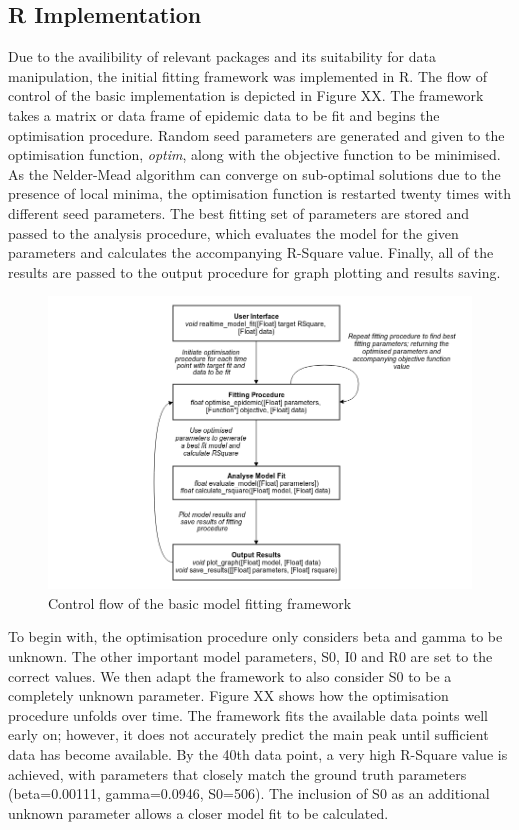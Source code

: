 \subsection{R Implementation}
Due to the availibility of relevant packages and its suitability for
data manipulation, the initial fitting framework was implemented in
R. The flow of control of the basic implementation is depicted in
Figure XX. The framework takes a matrix or data frame of epidemic data
to be fit and begins the optimisation procedure. Random seed
parameters are generated and given to the optimisation function,
\emph{optim}, along with the objective function to be minimised. As
the Nelder-Mead algorithm can converge on sub-optimal solutions due to
the presence of local minima, the optimisation function is restarted
twenty times with different seed parameters. The best fitting set of
parameters are stored and passed to the analysis procedure, which
evaluates the model for the given parameters and calculates the
accompanying R-Square value. Finally, all of the results are passed to
the output procedure for graph plotting and results saving.  

\begin{centering}
\begin{figure}[ht!]
  \includegraphics[width=15cm]{process1.png}
 \caption{Control flow of the basic model fitting framework} 
\end{figure}
\end{centering}

To begin with, the optimisation procedure only considers beta and
gamma to be unknown. The other important model parameters, S0, I0 and
R0 are set to the correct values. We then adapt the framework to also
consider S0 to be a completely unknown parameter. Figure XX shows how the optimisation
procedure unfolds over time. The framework fits the available data
points well early on; however, it does not accurately predict the main
peak until sufficient data has become available. By the 40th data
point, a very high R-Square value is achieved, with parameters that
closely match the ground truth parameters (beta=0.00111, gamma=0.0946,
S0=506). The inclusion of S0 as an additional unknown parameter allows
a closer model fit to be calculated.

